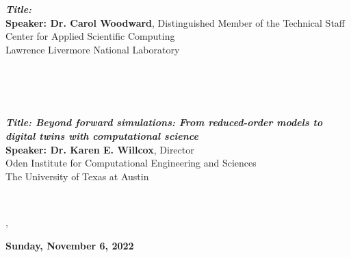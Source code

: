 \\[-10pt]
\\[-6pt]
\hspace*{0.138\textwidth}\parbox{0.94\textwidth}{{\bfseries\itshape Title:}\\
{\bf Speaker: Dr. Carol Woodward}, Distinguished Member of the Technical Staff\\
\hspace*{1.7cm}Center for Applied Scientific Computing\\
\hspace*{1.7cm}Lawrence Livermore National Laboratory
}\vspace{2ex}
\\[-10pt]
\\[-10pt]
\\[-6pt]
\hspace*{0.138\textwidth}\parbox{0.80\textwidth}{{\bfseries\itshape Title: Beyond forward simulations: From reduced-order models to digital twins with com\-pu\-tatio\-nal science}\\
{\bf Speaker: Dr. Karen E. Willcox}, Director\\
\hspace*{1.7cm}Oden Institute for Computational Engineering and Sciences\\
\hspace*{1.7cm}The University of Texas at Austin
}\hspace{0.20\textwidth}\vspace{2ex}

\\[-10pt]




,


\begin{center}
\large \bf Sunday, November 6, 2022
\end{center}

